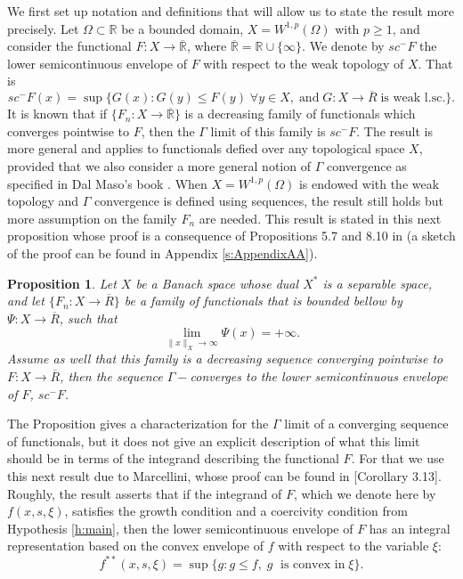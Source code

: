 \documentclass[11pt]{article}
\newcommand{\R}{\mathbb{R}}
\theoremstyle{plain}
\newtheorem{Proposition}[Lemma]{Proposition}
\begin{document}
We first set up notation and definitions that will allow us to state the result more precisely. Let $\Omega \subset \R$ be a bounded domain, $X= W^{1,p}(\Omega)$ with $p\geq 1$, and consider the functional $F:X \rightarrow \overline{\R}$, where $\overline{\R} = \R \cup \{ \infty\}$. We  denote by $sc^-F$ the lower semicontinuous envelope of $F$ with respect to the weak topology of $X$. That is
\[ sc^-F(x) = \sup \{G(x): G(y) \leq F(y)\; \forall y \in X, \; \mbox{and}\; G: X \rightarrow \overline{R} \; \mbox{is weak l.sc.} \}.\]
 It is known that if $\{F_n: X \rightarrow \overline{\R}\}$ is a decreasing family of functionals which converges pointwise to $F$, then the $\Gamma$ limit of this family is $sc^-F$. The result is more general and applies to functionals defied over any topological space $X$, provided that we also consider a more general notion of $\Gamma$ convergence as specified in Dal Maso's book  \cite{dal2012introduction}. When $X=W^{1,p}(\Omega)$ is endowed with the weak topology and $\Gamma$ convergence is defined using sequences, the result still holds but more assumption on the family $F_n$ are needed. This result is stated in this next proposition whose proof is a consequence of Propositions 5.7 and 8.10 in \cite{dal2012introduction} (a sketch of the proof can be found in Appendix \ref{s:AppendixAA}).

\begin{Proposition}\label{p:GammaLimit}
Let $X$ be a Banach space whose dual $X^*$ is a separable space, and let  $\{F_n: X \rightarrow \overline{R}\}$ be a family of functionals that is bounded bellow by $\Psi: X \rightarrow \overline{R}$, such that
\[ \lim_{\|x\|_X \rightarrow \infty } \Psi(x) = + \infty.\]
 Assume as well that this family is a decreasing sequence converging pointwise to $F:X \rightarrow \overline{R}$, then the sequence $\Gamma-$converges to the lower semicontinuous envelope of $F$, $sc^-F$.
\end{Proposition}



The Proposition gives a characterization for the $\Gamma$ limit of a converging sequence of functionals,  but it does not give an explicit description of what this limit should be in terms of the integrand describing the functional $F$. For that we use this next result due to Marcellini, whose proof can be found in \cite{marcellini1980semicontinuity}[Corollary 3.13]. Roughly, the result asserts that if the integrand of $F$, which we denote here by $f(x,s, \xi)$, satisfies the growth condition and a coercivity condition from Hypothesis \ref{h:main}, then the lower semicontinuous envelope of $F$ has an integral representation based on the convex envelope of $f$ with respect to the variable $\xi$: 
\[ f^{**}(x,s,\xi) = \sup \{ g: g \leq f,\; g\;\mbox{ is convex in} \; \xi\}.\]
\end{document}
